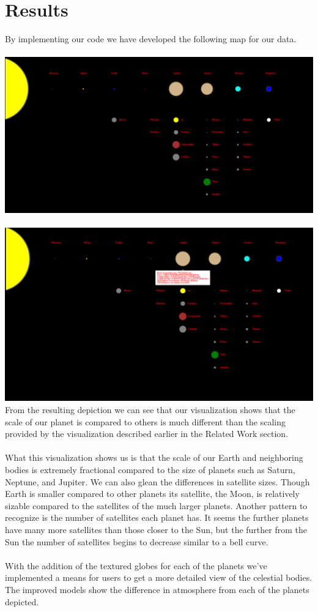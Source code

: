 \documentclass[journal]{vgtc}                %
\begin{document}
\section{Results}
By implementing our code we have developed the following map for our data.\\\\
\includegraphics[width=\linewidth]{system-map}
\\\\
\includegraphics[width=\linewidth]{details-planet}
From the resulting depiction we can see that our visualization shows that the scale of our planet is compared to others is much different than the scaling provided by the visualization described earlier in the Related Work section.
\\\\
What this visualization shows us is that the scale of our Earth and neighboring bodies is extremely fractional compared to the size of planets such as Saturn, Neptune,  and Jupiter. We can also glean the differences in satellite sizes. Though Earth is smaller compared to other planets its satellite, the Moon, is relatively sizable compared to the satellites of the much larger planets. Another pattern to recognize is the number of satellites each planet has. It seems the further planets have many more satellites than those closer to the Sun, but the further from the Sun the number of satellites begins to decrease similar to a bell curve.
\\\\
With the addition of the textured globes for each of the planets we've implemented a means for users to get a more detailed view of the celestial bodies.
The improved models show the difference in atmosphere from each of the planets depicted. 
\end{document}
